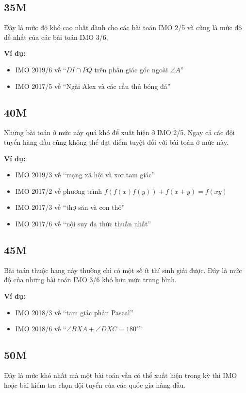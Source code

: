 \documentclass[../imo-training-open-book.tex]{subfiles}
\begin{document}
\subsection*{35M}
\label{app:35M}
Đây là mức độ khó cao nhất dành cho các bài toán IMO 2/5 và cũng là mức độ dễ nhất của các bài toán IMO 3/6.

\textbf{Ví dụ:}
\begin{itemize}
    \item IMO 2019/6 về ``$DI \cap PQ$ trên phân giác góc ngoài $\angle A$''
    \item IMO 2017/5 về ``Ngài Alex và các cầu thủ bóng đá''
\end{itemize}

\subsection*{40M}
\label{app:40M}
Những bài toán ở mức này quá khó để xuất hiện ở IMO 2/5. Ngay cả các đội tuyển hàng đầu cũng không thể đạt điểm tuyệt đối với bài toán ở mức này.

\textbf{Ví dụ:}
\begin{itemize}
    \item IMO 2019/3 về ``mạng xã hội và xor tam giác''
    \item IMO 2017/2 về phương trình $f(f(x)f(y)) + f(x+y) = f(xy)$
    \item IMO 2017/3 về ``thợ săn và con thỏ''
    \item IMO 2017/6 về ``nội suy đa thức thuần nhất''
\end{itemize}

\subsection*{45M}
\label{app:45M}
Bài toán thuộc hạng này thường chỉ có một số ít thí sinh giải được. Đây là mức độ của những bài toán IMO 3/6 khó hơn mức trung bình.

\textbf{Ví dụ:}
\begin{itemize}
    \item IMO 2018/3 về ``tam giác phản Pascal''
    \item IMO 2018/6 về ``$\angle BXA + \angle DXC = 180^\circ$''
\end{itemize}

\subsection*{50M}
\label{app:50M}
Đây là mức khó nhất mà một bài toán vẫn có thể xuất hiện trong kỳ thi IMO hoặc bài kiểm tra chọn đội tuyển của các quốc gia hàng đầu.
\end{document}
